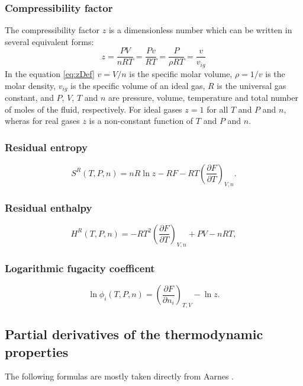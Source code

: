 \documentclass[english]{../thermomemo/thermomemo}
\newcommand{\dd}[2]{\frac{\partial #1}{\partial #2}}
\newcommand{\lp}{\left(}
\newcommand{\rp}{\right)}
\numberwithin{equation}{section}
\begin{document}
\subsubsection*{Compressibility factor}
\noindent
The compressibility factor $z$ is a dimensionless number which can be
written in several equivalent forms:
\begin{equation}
  \label{eq:zDef}
  z = \frac{PV}{nRT} = \frac{Pv}{RT} = \frac{P}{\rho RT}  = \frac{v}{v_{ig}}
\end{equation}
In the equation \eqref{eq:zDef} $v = V /n$ is the specific molar
volume, $\rho = 1/v$ is the molar density, $v_{ig}$ is the specific
volume of an ideal gas, $R$ is the universal gas constant, and $P$,
$V$, $T$ and $n$ are pressure, volume, temperature and total number of
moles of the fluid, respectively. For ideal gases $z=1$ for all $T$
and $P$ and $n$, wheras for real gases $z$ is a non-constant function
of $T$ and $P$ and $n$.

\subsubsection*{Residual entropy}
\begin{equation}
  \label{eq:Sres}
  S^R(T,P,n) = nR \ln z - RF - RT \lp \dd{F}{T} \rp_{V,n}. %
\end{equation}

\subsubsection*{Residual enthalpy}
\begin{equation}
  \label{eq:Hreduced}
  H^R(T,P,n) = -RT^2 \lp \dd{F}{T} \rp_{V,n} + PV - nRT, %
\end{equation}

\subsubsection*{Logarithmic fugacity coefficent}
\begin{equation}
  \label{eq:lnphireduced}
  \ln \phi_i(T,P,n) = \lp \dd{F}{n_i} \rp_{T,V} - \ln z. %
\end{equation}

\subsection{Partial derivatives of the thermodynamic properties}
The following formulas are mostly taken directly from Aarnes
\cite{Aarnes13}.
\end{document}
